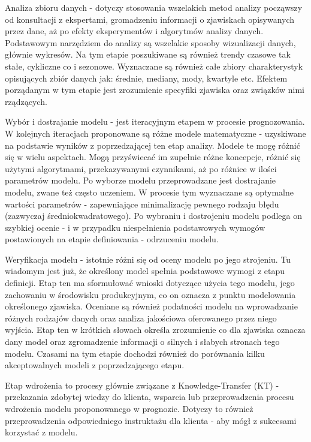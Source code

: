 \documentclass[10pt,a4paper]{book}
\begin{document}
Analiza zbioru danych - dotyczy stosowania wszelakich metod analizy począwszy od konsultacji z ekspertami, gromadzeniu informacji o zjawiskach opisywanych przez dane, aż po efekty eksperymentów i algorytmów analizy danych. Podstawowym narzędziem do analizy są wszelakie sposoby wizualizacji danych, głównie wykresów. Na tym etapie poszukiwane są również trendy czasowe tak stałe, cykliczne co i sezonowe. Wyznaczane są również całe zbiory charakterystyk opisujących zbiór danych jak: średnie, mediany, mody, kwartyle etc. Efektem porządanym w tym etapie jest zrozumienie specyfiki zjawiska oraz związków nimi rządzących.

Wybór i dostrajanie modelu  - jest iteracyjnym etapem w procesie prognozowania. W kolejnych iteracjach proponowane są różne modele matematyczne - uzyskiwane na podstawie wyników z poprzedzającej ten etap analizy. Modele te mogę różnić się w wielu aspektach. Mogą przyświecać im zupełnie różne koncepcje, różnić się użytymi algorytmami, przekazywanymi czynnikami, aż po różnice w ilości parametrów modelu. Po wyborze modelu przeprowadzane jest dostrajanie modelu, zwane też często uczeniem. W procesie tym wyznaczane są optymalne wartości parametrów - zapewniające minimalizację pewnego rodzaju błędu (zazwyczaj średniokwadratowego). Po wybraniu i dostrojeniu modelu podlega on szybkiej ocenie - i w przypadku niespełnienia podstawowych wymogów postawionych na etapie definiowania - odrzuceniu modelu.

Weryfikacja modelu - istotnie różni się od oceny modelu po jego strojeniu. Tu wiadomym jest już, że określony model spełnia podstawowe wymogi z etapu definicji. Etap ten ma sformułować wnioski dotyczące użycia tego modelu, jego zachowaniu w środowisku produkcyjnym, co on oznacza z punktu modelowania określonego zjawiska. Oceniane są również podatności modelu na wprowadzanie różnych rodzajów danych oraz analiza jakościowa oferowanego przez niego wyjścia. Etap ten w krótkich słowach określa zrozumienie co dla zjawiska oznacza dany model oraz zgromadzenie informacji o silnych i słabych stronach tego modelu. Czasami na tym etapie dochodzi również do porównania kilku akceptowalnych modeli z poprzedzającego etapu.

Etap wdrożenia to procesy głównie związane z Knowledge-Transfer (KT)  - przekazania zdobytej wiedzy do klienta, wsparcia lub przeprowadzenia procesu wdrożenia modelu proponowanego w prognozie. Dotyczy to również przeprowadzenia odpowiedniego instruktażu dla klienta - aby mógł z sukcesami korzystać z modelu.
\end{document}
